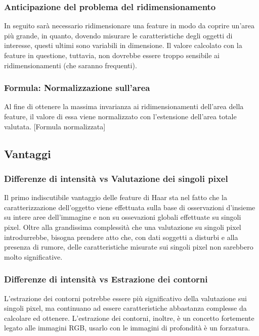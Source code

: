             \subsubsection{Anticipazione del problema del ridimensionamento}
            In seguito sarà necessario ridimensionare una feature in modo da coprire un'area più grande, in quanto, dovendo misurare le caratteristiche degli oggetti di interesse, questi ultimi sono variabili in dimensione.
            Il valore calcolato con la feature in questione, tuttavia, non dovrebbe essere troppo sensibile ai ridimensionamenti (che saranno frequenti).

            \subsubsection{Formula: Normalizzazione sull'area}
            Al fine di ottenere la massima invarianza ai ridimensionamenti dell'area della feature, il valore di essa viene normalizzato con l'estensione dell'area totale valutata.
            [Formula normalizzata]

        \subsection{Vantaggi}
            \subsubsection{Differenze di intensità vs Valutazione dei singoli pixel}
            Il primo indiscutibile vantaggio delle feature di Haar sta nel fatto che la caratterizzazione dell'oggetto viene effettuata sulla base di osservazioni d'insieme su intere aree dell'immagine e non su ossevazioni globali effettuate su singoli pixel.
            Oltre alla grandissima complessità che una valutazione su singoli pixel introdurrebbe, bisogna prendere atto che, con dati soggetti a disturbi e alla presenza di rumore, delle caratteristiche misurate sui singoli pixel non sarebbero molto significative.

            \subsubsection{Differenze di intensità vs Estrazione dei contorni}
            L'estrazione dei contorni potrebbe essere più significativo della valutazione sui singoli pixel, ma continuano ad essere caratteristiche abbastanza complesse da calcolare ed ottenere.
            L'estrazione dei contorni, inoltre, è un concetto fortemente legato alle immagini RGB, usarlo con le immagini di profondità è un forzatura.

